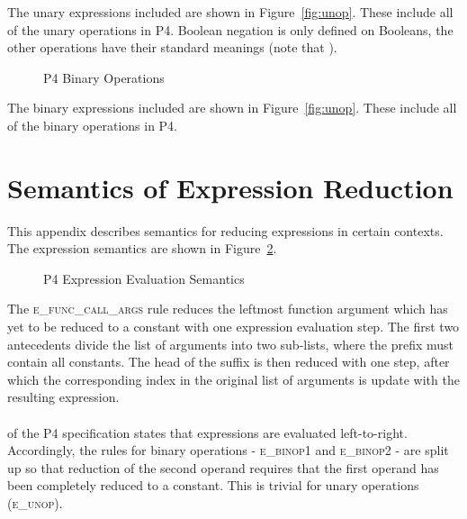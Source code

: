 \documentclass[UTF8]{article}
\begin{document}
The unary expressions included are shown in Figure~\ref{fig:unop}. These include all of the unary operations in P4. Boolean negation is only defined on Booleans, the other operations have their standard meanings (note that ).

\newpage
\begin{figure}[ht!]
\centering\ottgrammartabular{
\ottbinop\ottafterlastrule
}
\caption{P4 Binary Operations}
\label{fig:binop}
\end{figure}

The binary expressions included are shown in Figure~\ref{fig:unop}. These include all of the binary operations in P4.

\section{Semantics of Expression Reduction}
\label{app:exp}
This appendix describes semantics for reducing expressions in certain contexts. The expression semantics are shown in Figure~\ref{fig:semexp2}.

\begin{figure}[ht!]
\caption{P4 Expression Evaluation Semantics}
\label{fig:semexp2}
\end{figure}

The \textsc{e\_func\_call\_args} rule reduces the leftmost function argument which has yet to be reduced to a constant with one expression evaluation step. The first two antecedents divide the list of arguments into two sub-lists, where the prefix must contain all constants. The head of the suffix is then reduced with one step, after which the corresponding index in the original list of arguments is update with the resulting expression.
\\~\\
 of the P4 specification states that expressions are evaluated left-to-right. Accordingly, the rules for binary operations - \textsc{e\_binop1} and \textsc{e\_binop2} - are split up so that reduction of the second operand requires that the first operand has been completely reduced to a constant. This is trivial for unary operations (\textsc{e\_unop}).
\end{document}
